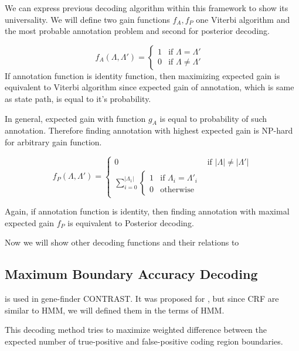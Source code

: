 We can express previous decoding algorithm within this framework to show
its universality. We will define two gain functions $f_A, f_P$ one 
Viterbi algorithm and the most probable annotation problem and second for
posterior decoding.

\begin{equation}
f_A(\Lambda,\Lambda') = \begin{cases}
1 & \text{if $\Lambda = \Lambda'$ }\\
0 & \text{if $\Lambda \not=\Lambda'$}
\end{cases}
\end{equation}
If annotation function is identity function, then maximizing expected gain is 
equivalent to Viterbi algorithm since expected gain of annotation, which is
same as state path, is equal to it's probability.

In general, expected gain with function $g_A$ is equal to probability of such
annotation. Therefore finding annotation with highest expected gain is NP-hard
for arbitrary gain function.

\begin{equation}
f_P(\Lambda,\Lambda') = 
\begin{cases}
0 & \text{if $|\Lambda|\not=|\Lambda'|$}\\
\sum_{i=0}^{|\Lambda_1|}\begin{cases}
1 & \text{if $\Lambda_i=\Lambda'_i$}\\
0 & \text{otherwise}
\end{cases}
\end{cases}
\end{equation}

Again, if annotation function is identity, then finding annotation with maximal
expected gain $f_P$ is equivalent to Posterior decoding. 

Now we will show other decoding functions and their relations to

\subsection{Maximum Boundary Accuracy Decoding}

\cite{} is used in gene-finder
CONTRAST\cite{}. It
was proposed for , but since CRF
are similar to HMM, we will defined them in the terms of HMM.

This decoding method tries to maximize weighted difference between the expected
number of true-positive and false-positive coding region boundaries.

